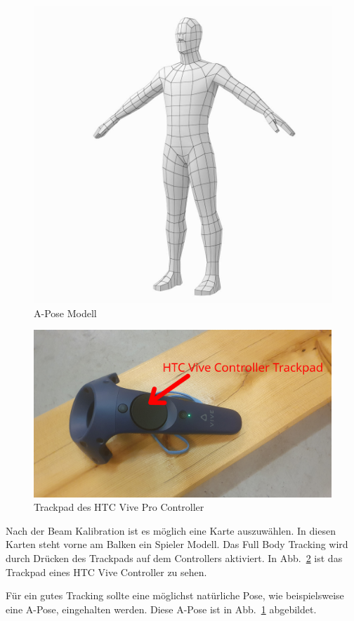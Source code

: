 \begin{figure}
    \centering
    \includegraphics[scale=0.3]{pics/a-pose-human}
    \caption{A-Pose Modell~\cite{vkstudio_2020}}
    \label{fig:a-pose-human}
\end{figure}

\begin{figure}
    \centering
    \includegraphics[scale=0.1]{pics/vive_controller_trackpad}
    \caption{Trackpad des HTC Vive Pro Controller}
    \label{fig:vive-controller-trackpad}
\end{figure}



Nach der Beam Kalibration ist es möglich eine Karte auszuwählen.
In diesen Karten steht vorne am Balken ein Spieler Modell.
Das Full Body Tracking wird durch Drücken des Trackpads auf dem Controllers aktiviert.
In Abb.~\ref{fig:vive-controller-trackpad} ist das Trackpad eines HTC Vive Controller zu sehen.

Für ein gutes Tracking sollte eine möglichst natürliche Pose, wie beispielsweise eine A-Pose, eingehalten werden.
Diese A-Pose ist in Abb.~\ref{fig:a-pose-human} abgebildet.

